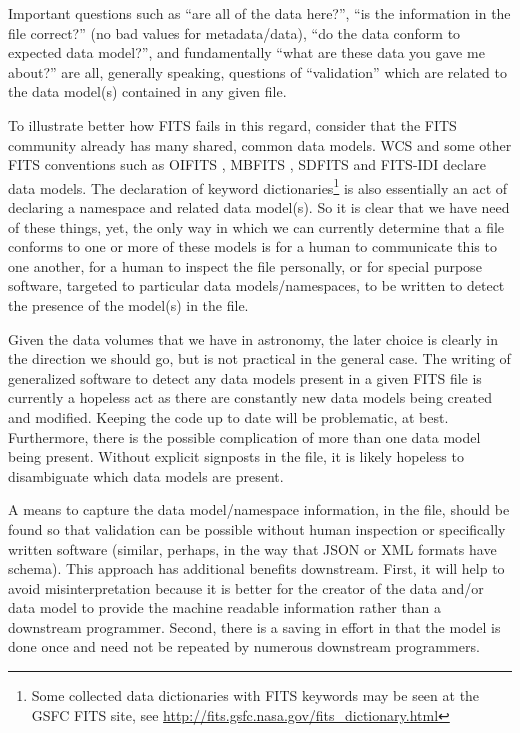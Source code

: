 \documentclass[final,authoryear,5p,times,twocolumn]{elsarticle}
\begin{document}
Important questions such as ``are all of the data here?'', ``is the
information in the file correct?'' (no bad values for metadata/data),
``do the data conform to expected data model?'', and fundamentally ``what
are these data you gave me about?'' are all, generally speaking,
questions of ``validation'' which are related to the data model(s)
contained in any given file.


To illustrate better how FITS fails in this regard, consider that the
FITS community already has many shared, common data models. WCS and
some other FITS conventions such as OIFITS
\citep{2006SPIE.6268E.106T}, MBFITS \citep{2006A&A...454L..25M},
SDFITS \citep{2000ASPC..216..243G} and FITS-IDI \citep{2011AIPS114}
declare data models. The declaration of keyword
dictionaries\footnote{Some collected data dictionaries with FITS
keywords may be seen at the GSFC FITS site, see
\url{http://fits.gsfc.nasa.gov/fits\_dictionary.html}} is also essentially
an act of declaring a namespace and related data model(s). So it is
clear that we have need of these things, yet, the only way in which we
can currently determine that a file conforms to one or more of these
models is for a human to communicate this to one another, for a human
to inspect the file personally, or for special purpose software,
targeted to particular data models/namespaces, to be written to detect
the presence of the model(s) in the file.


Given the data volumes that we have in astronomy, the later choice is
clearly in the direction we should go, but is not practical in the
general case. The writing of generalized software to detect any data
models present in a given FITS file is currently a hopeless act as
there are constantly new data models being created and
modified. Keeping the code up to date will be problematic, at
best. Furthermore, there is the possible complication of more than one
data model being present. Without explicit signposts in the file, it
is likely hopeless to disambiguate which data models are present.


A means to capture the data model/namespace information, in the file,
should be found so that validation can be possible without human
inspection or specifically written software (similar, perhaps, in the
way that JSON or XML formats have schema). This approach has
additional benefits downstream. First, it will help to avoid
misinterpretation because it is better for the creator of the data
and/or data model to provide the machine readable information rather
than a downstream programmer. Second, there is a saving in effort
in that the model is done once and need not be repeated by numerous
downstream programmers.
\end{document}
